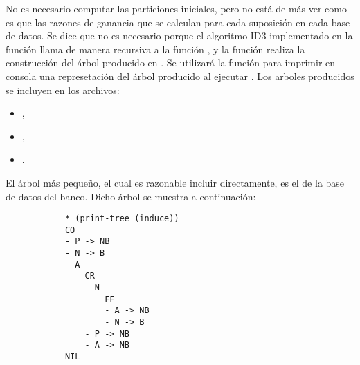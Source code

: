 \begin{itemize}
\begin{solution}
        No es necesario computar las particiones iniciales, pero no está de más ver como es que las razones de ganancia que se calculan para cada suposición en cada base de datos. Se dice que no es necesario porque el algoritmo ID3 implementado en la función  llama de manera recursiva a la función , y la función  realiza la construcción del árbol producido en . Se utilizará la función  para imprimir en consola una represetación del árbol producido al ejecutar . Los arboles producidos se incluyen en los archivos:
        \begin{itemize}
            \item {},
            \item {},
            \item {}.
        \end{itemize}

        El árbol más pequeño, el cual es razonable incluir directamente, es el de la base de datos del banco. Dicho árbol se muestra a continuación:
        \begin{verbatim}
            * (print-tree (induce))
            CO
            - P -> NB
            - N -> B
            - A
                CR
                - N
                    FF
                    - A -> NB
                    - N -> B
                - P -> NB
                - A -> NB
            NIL
        \end{verbatim}


\end{solution}
\end{itemize}
